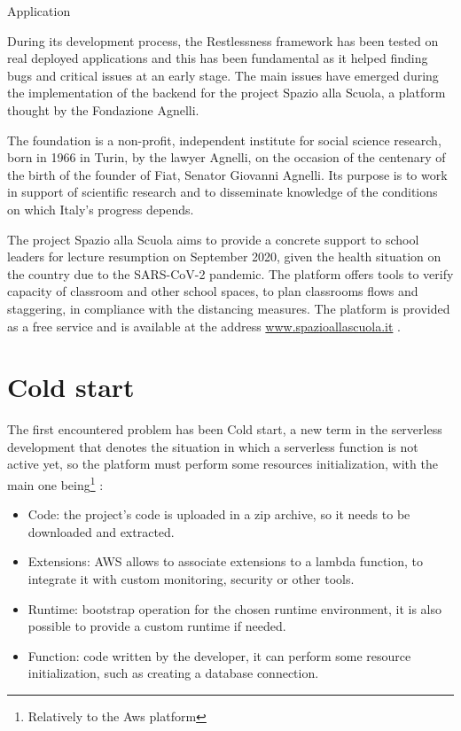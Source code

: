 \begin{chapter}{Application}
    \label{chap:application}

    During its development process, the Restlessness framework has been tested on
    real deployed applications and this has been fundamental as it helped finding
    bugs and critical issues at an early stage.
    The main issues have emerged during the implementation of the backend for the
    project Spazio alla Scuola, a platform thought by the Fondazione Agnelli.

    The foundation is a non-profit, independent institute for social science research,
    born in 1966 in Turin, by the lawyer Agnelli, on the occasion of the centenary
    of the birth of the founder of Fiat, Senator Giovanni Agnelli.
    Its purpose is to work in support of scientific research and to disseminate
    knowledge of the conditions on which Italy's progress depends.

    The project Spazio alla Scuola aims to provide a concrete support to school
    leaders for lecture resumption on September 2020, given the health situation on the
    country due to the SARS-CoV-2 pandemic.
    The platform offers tools to verify capacity of classroom and other school spaces,
    to plan classrooms flows and staggering, in compliance with the distancing measures.
    The platform is provided as a free service and is available at the address
    \url{www.spazioallascuola.it} \cite{spazio_alla_scuola}.

    \section{Cold start}
    \label{subsec:cold_start}

    The first encountered problem has been Cold start, a new term in the serverless
    development that denotes the situation in which a serverless function is not
    active yet, so the platform must perform some resources initialization, with the
    main one being\footnote{Relatively to the Aws platform} \cite{aws_doc_runtimes}:

    \begin{itemize}
        \item Code: the project's code is uploaded in a zip archive, so it needs to
            be downloaded and extracted.
        \item Extensions: AWS allows to associate extensions to a lambda function, to
            integrate it with custom monitoring, security or other tools.
        \item Runtime: bootstrap operation for the chosen runtime environment,
            it is also possible to provide a custom runtime if needed.
        \item Function: code written by the developer, it can perform some resource
            initialization, such as creating a database connection.
    \end{itemize}


\end{chapter}
